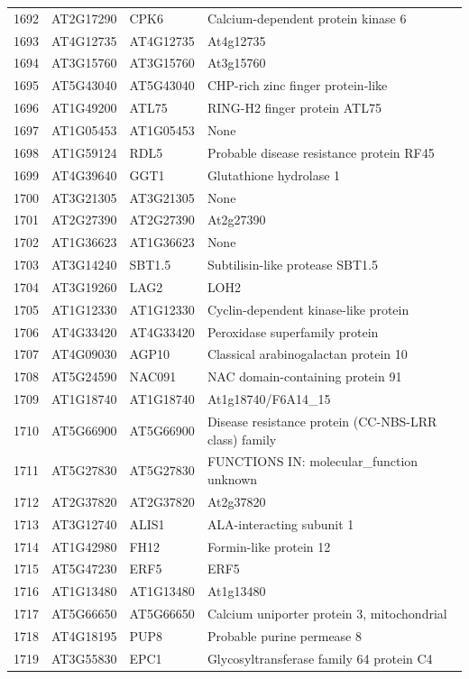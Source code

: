 \documentclass[11pt]{article}
\begin{document}
\begin{center}
\begin{tabular}{rlll}
1692 & AT2G17290 & CPK6 & Calcium-dependent protein kinase 6\\
1693 & AT4G12735 & AT4G12735 & At4g12735\\
1694 & AT3G15760 & AT3G15760 & At3g15760\\
1695 & AT5G43040 & AT5G43040 & CHP-rich zinc finger protein-like\\
1696 & AT1G49200 & ATL75 & RING-H2 finger protein ATL75\\
1697 & AT1G05453 & AT1G05453 & None\\
1698 & AT1G59124 & RDL5 & Probable disease resistance protein RF45\\
1699 & AT4G39640 & GGT1 & Glutathione hydrolase 1\\
1700 & AT3G21305 & AT3G21305 & None\\
1701 & AT2G27390 & AT2G27390 & At2g27390\\
1702 & AT1G36623 & AT1G36623 & None\\
1703 & AT3G14240 & SBT1.5 & Subtilisin-like protease SBT1.5\\
1704 & AT3G19260 & LAG2 & LOH2\\
1705 & AT1G12330 & AT1G12330 & Cyclin-dependent kinase-like protein\\
1706 & AT4G33420 & AT4G33420 & Peroxidase superfamily protein\\
1707 & AT4G09030 & AGP10 & Classical arabinogalactan protein 10\\
1708 & AT5G24590 & NAC091 & NAC domain-containing protein 91\\
1709 & AT1G18740 & AT1G18740 & At1g18740/F6A14\_15\\
1710 & AT5G66900 & AT5G66900 & Disease resistance protein (CC-NBS-LRR class) family\\
1711 & AT5G27830 & AT5G27830 & FUNCTIONS IN: molecular\_function unknown\\
1712 & AT2G37820 & AT2G37820 & At2g37820\\
1713 & AT3G12740 & ALIS1 & ALA-interacting subunit 1\\
1714 & AT1G42980 & FH12 & Formin-like protein 12\\
1715 & AT5G47230 & ERF5 & ERF5\\
1716 & AT1G13480 & AT1G13480 & At1g13480\\
1717 & AT5G66650 & AT5G66650 & Calcium uniporter protein 3, mitochondrial\\
1718 & AT4G18195 & PUP8 & Probable purine permease 8\\
1719 & AT3G55830 & EPC1 & Glycosyltransferase family 64 protein C4\\

\end{tabular}
\end{center}
\end{document}
